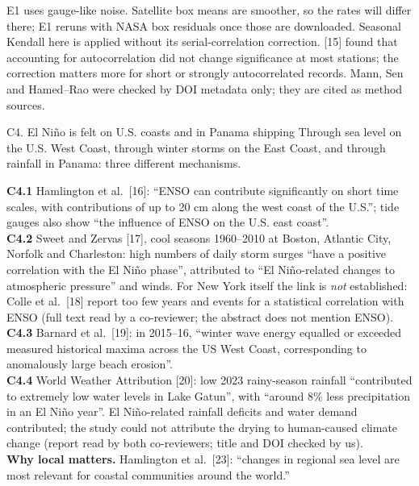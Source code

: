 \documentclass[10pt]{article}
\begin{document}
\begin{cabox}
E1 uses gauge-like noise. Satellite box means are smoother, so the rates will differ there; E1 reruns with NASA box residuals once those
are downloaded. Seasonal Kendall here is applied without its serial-correlation correction.
[15] found that accounting for autocorrelation did not change significance at most stations; the correction matters more for short or
strongly autocorrelated records. Mann, Sen and Hamed--Rao were checked by DOI metadata only; they are cited as method sources.
\end{cabox}

\begin{claimbox}{C4. El Ni\~no is felt on U.S. coasts and in Panama shipping}
Through sea level on the U.S. West Coast, through winter storms on the East Coast, and through rainfall in Panama: three different mechanisms.
\end{claimbox}
\begin{libox}
\textbf{C4.1} Hamlington et al.\ [16]: ``ENSO can contribute significantly on short time scales, with contributions of up to 20 cm along
the west coast of the U.S.''; tide gauges also show ``the influence of ENSO on the U.S. east coast''.\\
\textbf{C4.2} Sweet and Zervas [17], cool seasons 1960--2010 at Boston, Atlantic City, Norfolk and Charleston: high numbers of daily storm surges
``have a positive correlation with the El Ni\~no phase'', attributed to ``El Ni\~no-related changes to atmospheric pressure'' and winds.
For New York itself the link is \emph{not} established: Colle et al.\ [18] report too few years and events for a statistical correlation
with ENSO (full text read by a co-reviewer; the abstract does not mention ENSO).\\
\textbf{C4.3} Barnard et al.\ [19]: in 2015--16, ``winter wave energy equalled or exceeded measured historical maxima across the US West Coast,
corresponding to anomalously large beach erosion''.\\
\textbf{C4.4} World Weather Attribution [20]: low 2023 rainy-season rainfall ``contributed to extremely low water levels in Lake Gatun'', with
``around 8\% less precipitation in an El Ni\~no year''. El Ni\~no-related rainfall deficits and water demand contributed; the study could not
attribute the drying to human-caused climate change (report read by both co-reviewers; title and DOI checked by us).\\
\textbf{Why local matters.} Hamlington et al.\ [23]: ``changes in regional sea level are most relevant for coastal communities around the world.''
\end{libox}
\end{document}
